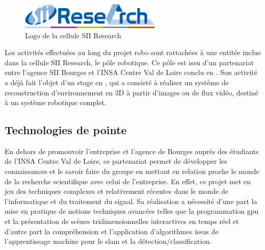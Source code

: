 {{				\begin{figure}[h]
				{
					\centering
					\includegraphics[page=1,width=0.6\textwidth]{figures/siiresearch.png}
					\caption{Logo de la cellule SII Research}
					\label{fig:sii_research}
				}
				\end{figure}
			}
			\par
			{
				Les activités effectuées au long du projet \gls{robo} sont rattachées à une entitée inclue dans la cellule SII Research, le pôle robotique. Ce pôle est issu d'un partenariat entre l'agence SII Bourges et l'INSA Centre Val de Loire conclu en . Son activité a déjà fait l'objet d'un stage en , qui a consisté à réaliser un système de reconstruction d'environnement en 3D à partir d'images ou de flux vidéo\cite{qr3d}, destiné à un système robotique complet.
			}
			
		\subsection{Technologies de pointe}
		
			\par
			{
				En dehors de promouvoir l'entreprise et l'agence de Bourges auprès des étudiants de l'INSA Centre Val de Loire, ce partenariat permet de développer les connaissances et le savoir faire du groupe en mettant en relation proche le monde de la recherche scientifique avec celui de l'entreprise. En effet, ce projet met en jeu des techniques complexes et relativement récentes dans le monde de l'informatique et du traitement du signal. Sa réalisation a nécessité d'une part la mise en pratique de notions techniques avancées telles que la programmation \gls{gpu} et la présentation de scènes tridimensionnelles interactives en temps réel et d'autre part la compréhension et l'application d'algorithmes issus de l'apprentissage machine pour le \gls{slam} et la détection/classification.
			}
}

